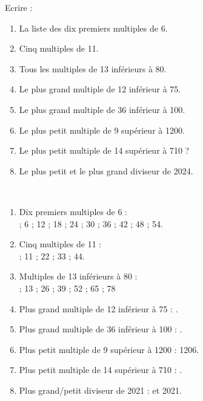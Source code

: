 \begin{exercice*}
    Ecrire :
    \begin{enumerate}
       \item La liste des dix premiers multiples de 6.
       \item Cinq multiples de 11.
       \item Tous les multiples de 13 inférieurs à 80.
       \item Le plus grand multiple de 12 inférieur à 75.
       \item Le plus grand multiple de 36 inférieur à 100.
       \item Le plus petit multiple de 9 supérieur à \num{1 200}.
       \item Le plus petit multiple de 14 supérieur à 710 ?
       \item Le plus petit et le plus grand diviseur de \num{2 024}.
    \end{enumerate}
\end{exercice*}
\begin{corrige}
    \phantom{rrr}\\
    \begin{changemargin}{-5mm}{-5mm}
        \begin{enumerate}
        \item Dix premiers multiples de 6 : \\
            { ; 6 ; 12 ; 18 ; 24 ; 30 ; 36 ; 42 ; 48 ; 54}.
        \item Cinq multiples de 11 : \\
            { ; 11 ; 22 ; 33 ; 44}.
        \item Multiples de 13 inférieurs à 80 : \\
            { ; 13 ; 26 ; 39 ; 52 ; 65 ; 78}
        \item Plus grand multiple de 12 inférieur à 75 : {}.
        \item Plus grand multiple de 36 inférieur à 100 : {}.
        \item Plus petit multiple de 9 supérieur à \num{1 200} : {\red \num{1 206}}.
        \item Plus petit multiple de 14 supérieur à 710 : {}.
        \item Plus grand/petit diviseur de \num{2 021} : { et \num{2 021}}.
        \end{enumerate}
    \end{changemargin}
\end{corrige}